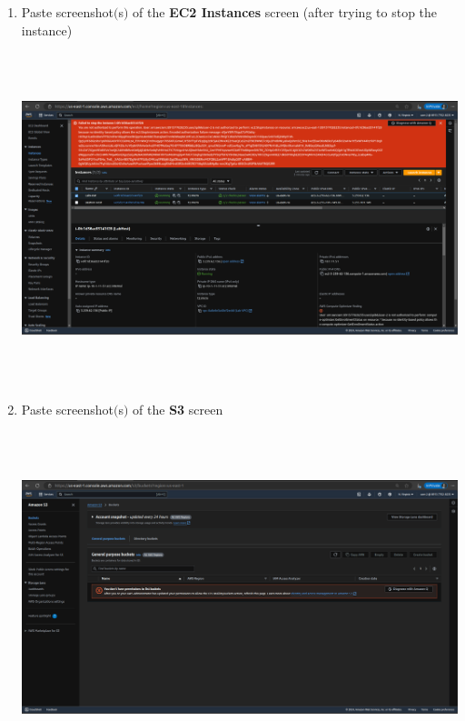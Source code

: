\documentclass[11pt]{article}
\begin{document}
\begin{enumerate}[resume]
    \vspace{75mm}

    \item Paste screenshot$($s$)$ of the \textbf{EC2 Instances} screen (after trying to stop the instance) \\
    \vspace{5mm}

    {\centering
    \includegraphics[width=6.1in, height=3.8in]{pics/11.png}
    }


    \item Paste screenshot$($s$)$ of the \textbf{S3} screen\\
    \vspace{5mm}

    {\centering
    \includegraphics[width=6.1in, height=3.8in]{pics/12.png}
    }


\end{enumerate}
\end{document}
